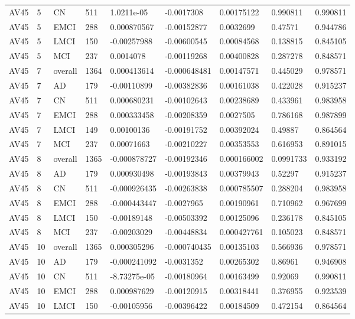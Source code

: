 \begin{landscape}
\begin{longtable}{lllllllll}
AV45 & 5 & CN & 511 & 1.0211e-05 & -0.0017308 & 0.00175122 & 0.990811 & 0.990811 \\
AV45 & 5 & EMCI & 288 & 0.000870567 & -0.00152877 & 0.0032699 & 0.47571 & 0.944786 \\
AV45 & 5 & LMCI & 150 & -0.00257988 & -0.00600545 & 0.00084568 & 0.138815 & 0.845105 \\
AV45 & 5 & MCI & 237 & 0.0014078 & -0.00119268 & 0.00400828 & 0.287278 & 0.848571 \\
AV45 & 7 & overall & 1364 & 0.000413614 & -0.000648481 & 0.00147571 & 0.445029 & 0.978571 \\
AV45 & 7 & AD & 179 & -0.00110899 & -0.00382836 & 0.00161038 & 0.422028 & 0.915237 \\
AV45 & 7 & CN & 511 & 0.000680231 & -0.00102643 & 0.00238689 & 0.433961 & 0.983958 \\
AV45 & 7 & EMCI & 288 & 0.000333458 & -0.00208359 & 0.0027505 & 0.786168 & 0.987899 \\
AV45 & 7 & LMCI & 149 & 0.00100136 & -0.00191752 & 0.00392024 & 0.49887 & 0.864564 \\
AV45 & 7 & MCI & 237 & 0.00071663 & -0.00210227 & 0.00353553 & 0.616953 & 0.891015 \\
AV45 & 8 & overall & 1365 & -0.000878727 & -0.00192346 & 0.000166002 & 0.0991733 & 0.933192 \\
AV45 & 8 & AD & 179 & 0.000930498 & -0.00193843 & 0.00379943 & 0.52297 & 0.915237 \\
AV45 & 8 & CN & 511 & -0.000926435 & -0.00263838 & 0.000785507 & 0.288204 & 0.983958 \\
AV45 & 8 & EMCI & 288 & -0.000443447 & -0.0027965 & 0.00190961 & 0.710962 & 0.967699 \\
AV45 & 8 & LMCI & 150 & -0.00189148 & -0.00503392 & 0.00125096 & 0.236178 & 0.845105 \\
AV45 & 8 & MCI & 237 & -0.00203029 & -0.00448834 & 0.000427761 & 0.105023 & 0.848571 \\
AV45 & 10 & overall & 1365 & 0.000305296 & -0.000740435 & 0.00135103 & 0.566936 & 0.978571 \\
AV45 & 10 & AD & 179 & -0.000241092 & -0.0031352 & 0.00265302 & 0.86961 & 0.946908 \\
AV45 & 10 & CN & 511 & -8.73275e-05 & -0.00180964 & 0.00163499 & 0.92069 & 0.990811 \\
AV45 & 10 & EMCI & 288 & 0.000987629 & -0.00120915 & 0.00318441 & 0.376955 & 0.923539 \\
AV45 & 10 & LMCI & 150 & -0.00105956 & -0.00396422 & 0.00184509 & 0.472154 & 0.864564 \\

\end{longtable}
\end{landscape}
